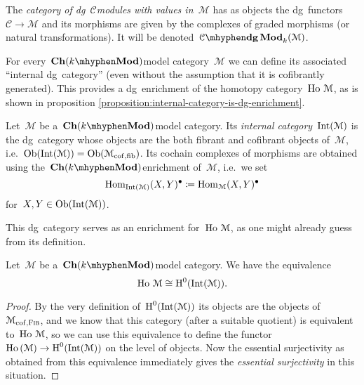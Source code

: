 \begin{refsection}
\begin{definition}
  The \emph{category of dg~$\mathcal{C}$\dash modules with values in~$\mathcal{M}$} has as objects the dg~functors~$\mathcal{C}\to\mathcal{M}$ and its morphisms are given by the complexes of graded morphisms (or natural transformations). It will be denoted~$\dgMod{\mathcal{C}}_k(\mathcal{M})$.
\end{definition}

For every~$\Ch(k\mhyphen\Mod)$\dash model category~$\mathcal{M}$ we can define its associated ``internal dg~category'' (even without the assumption that it is cofibrantly generated). This provides a dg~enrichment of the homotopy category~$\operatorname{\mathrm{Ho} \,}\mathcal{M}$, as is shown in proposition \ref{proposition:internal-category-is-dg-enrichment}.
\begin{definition}
  \label{definition:internal-dg-category}
  Let~$\mathcal{M}$ be a~$\Ch(k\mhyphen\Mod)$\dash model category. Its \emph{internal category}~$\operatorname{Int}(\mathcal{M})$ is the dg~category whose objects are the both fibrant and cofibrant objects of~$\mathcal{M}$, i.e.\ $\operatorname{Ob}(\operatorname{Int}(\mathcal{M}))=\operatorname{Ob}(\mathcal{M}_{\mathrm{cof},\mathrm{fib}})$. Its cochain complexes of morphisms are obtained using the~$\Ch(k\mhyphen\Mod)$\dash enrichment of~$\mathcal{M}$, i.e.\ we set
  \begin{equation}
    \mathrm{Hom}_{\operatorname{Int}(\mathcal{M})}(X,Y)^\bullet\coloneqq\mathrm{Hom}_{\mathcal{M}}(X,Y)^\bullet
  \end{equation}
  for~$X,Y\in\operatorname{Ob}(\operatorname{Int}(\mathcal{M}))$.
\end{definition}
This dg~category serves as an enrichment for~$\operatorname{\mathrm{Ho} \,}\mathcal{M}$, as one might already guess from its definition.
\begin{proposition}
  \label{proposition:internal-category-is-dg-enrichment}
  Let~$\mathcal{M}$ be a~$\Ch(k\mhyphen\Mod)$\dash model category. We have the equivalence
  \begin{equation}
    \operatorname{\mathrm{Ho} \,}\mathcal{M}\cong\operatorname{H}^0(\operatorname{Int}(\mathcal{M})).
  \end{equation}

  \begin{proof}
    By the very definition of~$\operatorname{H}^0(\operatorname{Int}(\mathcal{M}))$ its objects are the objects of~$\mathcal{M}_{\mathrm{cof},\textsc{Fib}}$, and we know that this category (after a suitable quotient) is equivalent to~$\operatorname{\mathrm{Ho} \,}\mathcal{M}$, so we can use this equivalence to define the functor~$\operatorname{\mathrm{Ho} \,}(\mathcal{M})\to\operatorname{H}^0(\operatorname{Int}(\mathcal{M}))$ on the level of objects. Now the essential surjectivity as obtained from this equivalence immediately gives the \emph{essential surjectivity} in this situation.


\end{proof}
\end{proposition}
\end{refsection}
